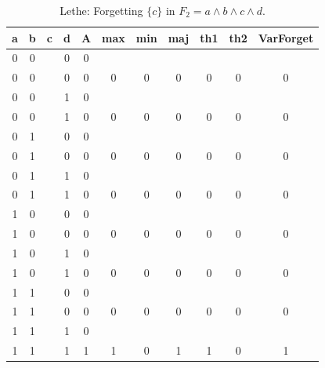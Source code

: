 \begin{table}[!tb]
    \centering
    \begin{tabular}{|c|c|c|c|c|c|c|c|c|c|c|}
        \hline
        \textbf{a} & \textbf{b} & \textbf{c} & \textbf{d} & \textbf{A} & \textbf{max} & \textbf{min} & \textbf{maj} & \textbf{th1} & \textbf{th2} & \textbf{VarForget} \\ \hline
        \rowcolor{gray!40} 0 & 0 &  & 0 & 0 &  &  &  &  &  &  \\ \hline
        \rowcolor{gray!40} 0 & 0 &  & 0 & 0 & 0 & 0 & 0 & 0 & 0 & 0 \\ \hline
        \rowcolor{blue!40} 0 & 0 &  & 1 & 0 &  &  &  &  &  &  \\ \hline
        \rowcolor{blue!40} 0 & 0 &  & 1 & 0 & 0 & 0 & 0 & 0 & 0 & 0 \\ \hline
        \rowcolor{red!40} 0 & 1 &  & 0 & 0 &  &  &  &  &  &  \\ \hline
        \rowcolor{red!40} 0 & 1 &  & 0 & 0 & 0 & 0 & 0 & 0 & 0 & 0 \\ \hline
        \rowcolor{green!40} 0 & 1 &  & 1 & 0 &  &  &  &  &  &  \\ \hline
        \rowcolor{green!40} 0 & 1 &  & 1 & 0 & 0 & 0 & 0 & 0 & 0 & 0 \\ \hline
        \rowcolor{yellow!40} 1 & 0 &  & 0 & 0 &  &  &  &  &  &  \\ \hline
        \rowcolor{yellow!40} 1 & 0 &  & 0 & 0 & 0 & 0 & 0 & 0 & 0 & 0 \\ \hline
        \rowcolor{gray!40} 1 & 0 &  & 1 & 0 &  &  &  &  &  &  \\ \hline
        \rowcolor{gray!40} 1 & 0 &  & 1 & 0 & 0 & 0 & 0 & 0 & 0 & 0 \\ \hline
        \rowcolor{blue!40} 1 & 1 &  & 0 & 0 &  &  &  &  &  &  \\ \hline
        \rowcolor{blue!40} 1 & 1 &  & 0 & 0 & 0 & 0 & 0 & 0 & 0 & 0 \\ \hline
        \rowcolor{red!40} 1 & 1 &  & 1 & 0 &  &  &  &  &  &  \\ \hline
        \rowcolor{red!40} 1 & 1 &  & 1 & 1 & 1 & 0 & 1 & 1 & 0 & 1 \\ \hline
    \end{tabular}
    \caption{Lethe: Forgetting $\{c\}$ in $F_{2} = a \land b \land c \land d$.}
    \label{tab:lethe-F2-c}
\end{table}
